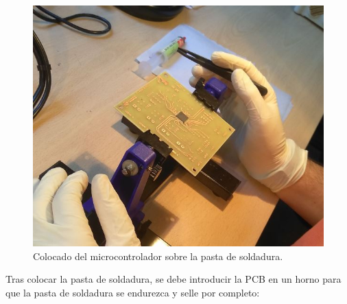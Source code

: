 \begin{enumerate}
    \begin{figure}[H]
    \centering 
    \includegraphics[width=0.55\linewidth]{pictures/ColocadoSMD.jpg}
    \caption{Colocado del microcontrolador sobre la pasta de soldadura.}
    \end{figure}

    Tras colocar la pasta de soldadura, se debe introducir la \ac{PCB} en un horno para que la pasta de soldadura se endurezca y selle por completo:
    

\end{enumerate}
